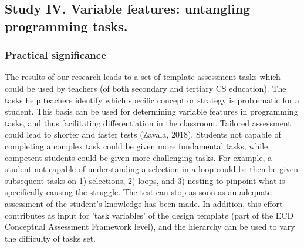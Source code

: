 \subsection{Study IV. Variable features: untangling programming tasks.}
\subsubsection*{Practical significance}

The results of our research leads to a set of template assessment tasks which could be used by teachers (of both secondary and tertiary CS education). The tasks help teachers identify which specific concept or strategy is problematic for a student. This basis can be used for determining variable features in programming tasks, and thus facilitating differentiation in the classroom. Tailored assessment could lead to shorter and faster tests (Zavala, 2018). Students not capable of completing a complex task could be given more fundamental tasks, while competent students could be given more challenging tasks. For example, a student not capable of understanding a selection in a loop could be then be given subsequent tasks on 1) selections, 2) loops, and 3) nesting to pinpoint what is specifically causing the struggle. The test can stop as soon as an adequate assessment of the student’s knowledge has been made. In addition, this effort contributes as input for 'task variables' of the design template (part of the ECD Conceptual Assessment Framework level), and the hierarchy can be used to vary the difficulty of tasks set.




